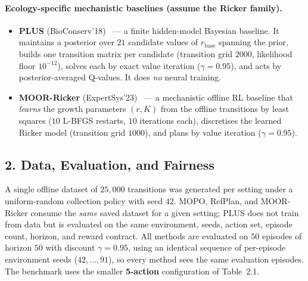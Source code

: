 \documentclass[11pt]{article}
\newcommand{\rbase}{r_{\mathrm{base}}}
\begin{document}
\paragraph{Ecology-specific mechanistic baselines (assume the Ricker family).}
\begin{itemize}
    \item \textbf{PLUS} (BioConserv'18)~\cite{memarzadeh2018} --- a finite hidden-model Bayesian
    baseline. It maintains a posterior over $21$ candidate values of $\rbase$
    spanning the prior, builds one transition matrix per candidate (transition
    grid $2000$, likelihood floor $10^{-12}$), solves each by exact value
    iteration ($\gamma = 0.95$), and acts by posterior-averaged Q-values. It does
    \emph{no} neural training.
    \item \textbf{MOOR-Ricker} (ExpertSys'23)~\cite{ju2023moor} --- a mechanistic offline RL
    baseline that \emph{learns} the growth parameters $(r, K)$ from the offline
    transitions by least squares ($10$ L-BFGS restarts, $10$ iterations each),
    discretises the learned Ricker model (transition grid $1000$), and plans by
    value iteration ($\gamma = 0.95$).
\end{itemize}

\subsection*{2. Data, Evaluation, and Fairness}
A single offline dataset of $25{,}000$ transitions was generated per setting under
a uniform-random collection policy with seed $42$. MOPO, RefPlan, and MOOR-Ricker
consume the \emph{same} saved dataset for a given setting; PLUS does not train from
data but is evaluated on the same environment, seeds, action set, episode count,
horizon, and reward contract. All methods are evaluated on $50$ episodes of
horizon $50$ with discount $\gamma = 0.95$, using an identical sequence of
per-episode environment seeds ($42, \dots, 91$), so every method sees the same
evaluation episodes. The benchmark uses the smaller \textbf{5-action}
configuration of Table~2.1.

\end{document}
